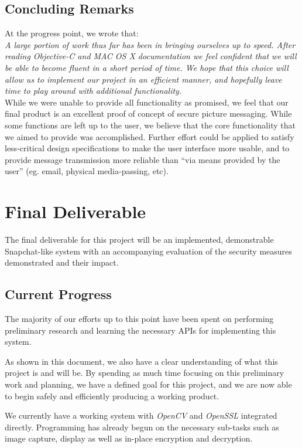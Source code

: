 \documentclass[11pt, a4paper,titlepage]{report}
\begin{document}
\section{Concluding Remarks}
At the progress point, we wrote that:\\

\noindent\emph{A large portion of work thus far has been in bringing ourselves up to speed. After reading Objective-C and MAC OS X documentation we feel confident that we will be able to become fluent in a short period of time. We hope that this choice will allow us to implement our project in an efficient manner, and hopefully leave time to play around with additional functionality.}\\

While we were unable to provide all functionality as promised, we feel that our final product is an excellent proof of concept of secure picture messaging. While some functions are left up to the user, we believe that the core functionality that we aimed to provide was accomplished. Further effort could be applied to satisfy less-critical design specifications to make the user interface more usable, and to provide message transmission more reliable than ``via means provided by the user'' (eg. email, physical media-passing, etc). 

\chapter{Final Deliverable}
The final deliverable for this project will be an implemented, demonstrable Snapchat-like system with an accompanying evaluation of the security measures demonstrated and their impact.
\section{Current Progress}
The majority of our efforts up to this point have been spent on performing preliminary research and learning the necessary APIs for implementing this system.

As shown in this document, we also have a clear understanding of what this project is and will be. By spending as much time focusing on this preliminary work and planning, we have a defined goal for this project, and we are now able to begin safely and efficiently producing a working product.

We currently have a working system with \emph{OpenCV} and \emph{OpenSSL} integrated directly. Programming has already begun on the necessary sub-tasks such as image capture, display as well as in-place encryption and decryption.


\printbibliography 
\nocite{*}
\end{document}
